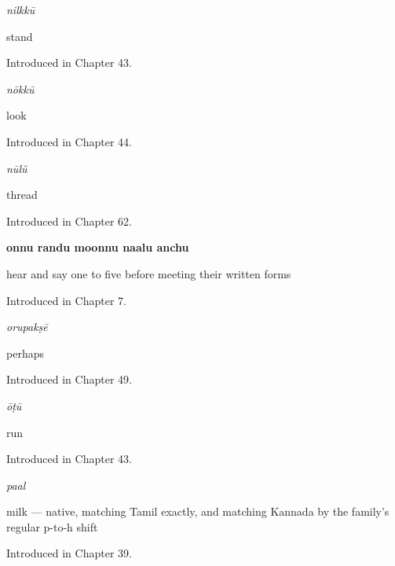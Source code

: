 \noindent\begin{minipage}[t]{\linewidth}
\raggedright
\textbf{}\enspace\emph{nilkkū}\par
\small stand\par
\footnotesize Introduced in Chapter 43.
\end{minipage}\par\medskip

\noindent\begin{minipage}[t]{\linewidth}
\raggedright
\textbf{}\enspace\emph{nōkkū}\par
\small look\par
\footnotesize Introduced in Chapter 44.
\end{minipage}\par\medskip

\noindent\begin{minipage}[t]{\linewidth}
\raggedright
\textbf{}\enspace\emph{nūlŭ}\par
\small thread\par
\footnotesize Introduced in Chapter 62.
\end{minipage}\par\medskip

\noindent\begin{minipage}[t]{\linewidth}
\raggedright
\textbf{onnu randu moonnu naalu anchu}\par
\small hear and say one to five before meeting their written forms\par
\footnotesize Introduced in Chapter 7.
\end{minipage}\par\medskip

\noindent\begin{minipage}[t]{\linewidth}
\raggedright
\textbf{}\enspace\emph{orupakṣē}\par
\small perhaps\par
\footnotesize Introduced in Chapter 49.
\end{minipage}\par\medskip

\noindent\begin{minipage}[t]{\linewidth}
\raggedright
\textbf{}\enspace\emph{ōṭū}\par
\small run\par
\footnotesize Introduced in Chapter 43.
\end{minipage}\par\medskip

\noindent\begin{minipage}[t]{\linewidth}
\raggedright
\textbf{}\enspace\emph{paal}\par
\small milk — native, matching Tamil exactly, and matching Kannada by the family's regular p-to-h shift\par
\footnotesize Introduced in Chapter 39.
\end{minipage}\par\medskip

